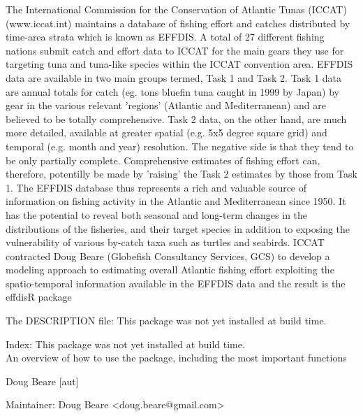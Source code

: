 \documentclass[letterpaper]{book}
\begin{document}
%
\begin{Description}\relax
The International Commission for the Conservation of Atlantic Tunas (ICCAT) (www.iccat.int) maintains a database of fishing effort and catches distributed by time-area strata which is known as EFFDIS. A  total of 27 different fishing nations submit catch and effort data to ICCAT for the main gears they use for targeting tuna and tuna-like species within the ICCAT convention area. EFFDIS data are available in two main groups termed, Task 1 and Task 2. Task 1 data are annual totals for catch (eg. tons bluefin tuna caught in 1999 by Japan) by gear in the various relevant 'regions' (Atlantic and Mediterranean) and are believed to be totally comprehensive. Task 2 data, on the other hand, are much more detailed, available at greater spatial (e.g. 5x5 degree square grid) and temporal (e.g. month and year) resolution. The negative side is that they tend to be only partially complete. Comprehensive estimates of fishing effort can, therefore, potentilly be made by 'raising' the Task 2 estimates by those from Task 1.  The EFFDIS database thus represents a rich and valuable source of information on fishing activity in the Atlantic and Mediterranean since 1950. It has the potential to reveal both seasonal and long-term changes in the distributions of the fisheries, and their target species in addition to exposing the vulnerability of various by-catch taxa such as turtles and seabirds. ICCAT contracted Doug Beare (Globefish Consultancy Services, GCS) to develop a modeling approach to estimating overall Atlantic fishing effort exploiting the spatio-temporal information available in the EFFDIS data and the result is the effdisR package
\end{Description}
%
\begin{Details}\relax
The DESCRIPTION file:
This package was not yet installed at build time.\\{}

Index:  This package was not yet installed at build time.\\{}
An overview of how to use the package, including the most important functions
\end{Details}
%
\begin{Author}\relax
Doug Beare [aut]

Maintainer: Doug Beare <doug.beare@gmail.com>
\end{Author}
\end{document}
